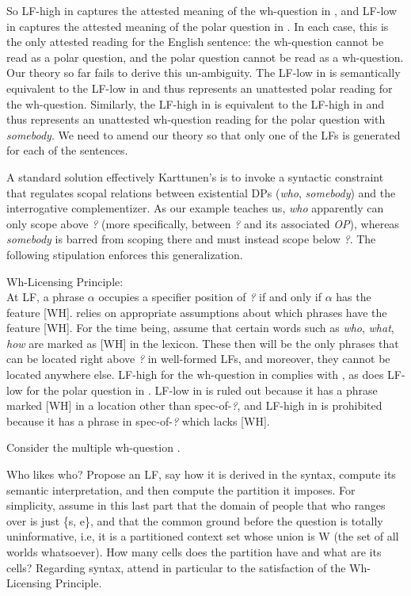 So LF-high in  captures the attested meaning of the
wh-question in , and LF-low in 
captures the attested meaning of the polar question in . In
each case, this is the only attested reading for the English sentence: the
wh-question cannot be read as a polar question, and the polar question cannot be
read as a wh-question. Our theory so far fails to derive this un-ambiguity. The
LF-low in  is semantically equivalent to the LF-low in
 and thus represents an unattested polar reading
for the wh-question. Similarly, the LF-high in  is
equivalent to the LF-high in  and thus represents an
unattested wh-question reading for the polar question with \emph{somebody}. We
need to amend our theory so that only one of the LFs is generated for each of
the sentences.

A standard solution \dash effectively Karttunen's \dash is to invoke a syntactic
constraint that regulates scopal relations between existential DPs (\emph{who},
\emph{somebody}) and the interrogative complementizer. As our example teaches
us, \emph{who} apparently can only scope above \emph{?} (more specifically,
between \emph{?} and its associated \emph{OP}), whereas \emph{somebody} is
barred from scoping there and must instead scope below \emph{?}. The following
stipulation enforces this generalization.

\ex Wh-Licensing Principle:\\
At LF, a phrase $\alpha$ occupies a specifier position of \emph{?} if and only
if $\alpha$ has the feature [WH].
\xe
%
\Last relies on appropriate assumptions about which phrases have the feature
[WH]. For the time being, assume that certain words such as \emph{who},
\emph{what}, \emph{how} are marked as [WH] in the lexicon. These then will be
the only phrases that can be located right above \emph{?} in well-formed LFs,
and moreover, they cannot be located anywhere else. LF-high for the wh-question
in  complies with \Last, as does LF-low for the polar
question in . LF-low in 
is ruled out because it has a phrase marked [WH] in a location other than
spec-of-\emph{?}, and LF-high in  is prohibited
because it has a phrase in spec-of-\emph{?} which lacks [WH].

\begin{exercise}\label{exe:wh-wh}
  Consider the multiple wh-question \Next.

  \ex Who likes who? \xe
%
  Propose an LF, say how it is derived in the syntax, compute its semantic
  interpretation, and then compute the partition it imposes. For simplicity,
  assume in this last part that the domain of people that who ranges over is
  just \{s, e\}, and that the common ground before the question is totally
  uninformative, i.e, it is a partitioned context set whose union is W (the set
  of all worlds whatsoever). How many cells does the partition have and what are
  its cells? Regarding syntax, attend in particular to the satisfaction of the
  Wh-Licensing Principle.
\end{exercise}

